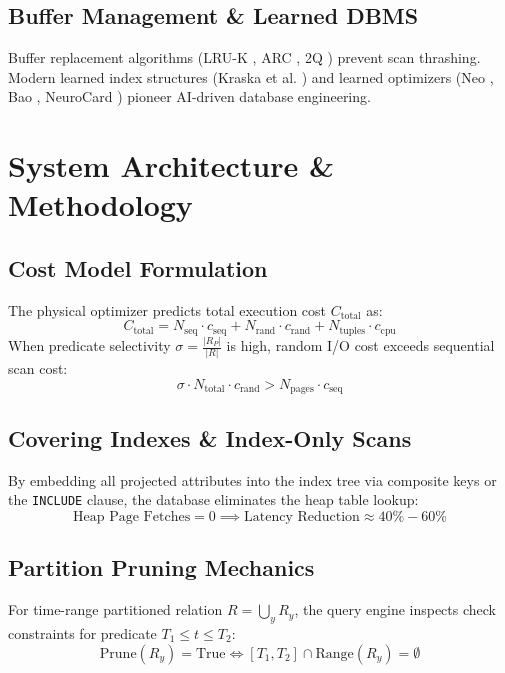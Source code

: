 \documentclass[journal]{IEEEtran}
\begin{document}
\subsection{Buffer Management \& Learned DBMS}
Buffer replacement algorithms (LRU-K \cite{oneil1993lruk}, ARC \cite{megiddo2003arc}, 2Q \cite{johnson19942q}) prevent scan thrashing. Modern learned index structures (Kraska et al. \cite{kraska2018case}) and learned optimizers (Neo \cite{marcus2019neo}, Bao \cite{marcus2021bao}, NeuroCard \cite{yang2020neurocard}) pioneer AI-driven database engineering.

\section{System Architecture \& Methodology}
\subsection{Cost Model Formulation}
The physical optimizer predicts total execution cost $C_{\text{total}}$ as:
\begin{equation}
C_{\text{total}} = N_{\text{seq}} \cdot c_{\text{seq}} + N_{\text{rand}} \cdot c_{\text{rand}} + N_{\text{tuples}} \cdot c_{\text{cpu}}
\end{equation}
When predicate selectivity $\sigma = \frac{|R_P|}{|R|}$ is high, random I/O cost exceeds sequential scan cost:
\begin{equation}
\sigma \cdot N_{\text{total}} \cdot c_{\text{rand}} > N_{\text{pages}} \cdot c_{\text{seq}}
\end{equation}

\subsection{Covering Indexes \& Index-Only Scans}
By embedding all projected attributes into the index tree via composite keys or the \texttt{INCLUDE} clause, the database eliminates the heap table lookup:
\begin{equation}
\text{Heap Page Fetches} = 0 \implies \text{Latency Reduction} \approx 40\%-60\%
\end{equation}

\subsection{Partition Pruning Mechanics}
For time-range partitioned relation $R = \bigcup_{y} R_y$, the query engine inspects check constraints for predicate $T_1 \le t \le T_2$:
\begin{equation}
\text{Prune}(R_y) = \text{True} \iff [T_1, T_2] \cap \text{Range}(R_y) = \emptyset
\end{equation}
\end{document}
